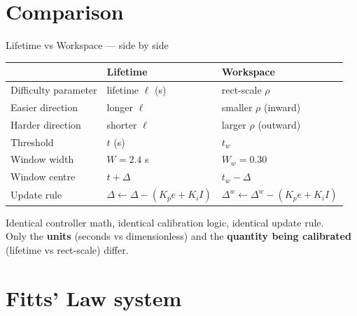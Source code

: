 \documentclass[10pt,aspectratio=169]{beamer}
\begin{document}
\section{Comparison}

\begin{frame}{Lifetime vs Workspace --- side by side}
\begin{center}
\begin{tabular}{lll}
\toprule
& \textbf{Lifetime} & \textbf{Workspace} \\
\midrule
Difficulty parameter & lifetime $\ell$ (s) & rect-scale $\rho$ \\
Easier direction & longer $\ell$ & smaller $\rho$ (inward) \\
Harder direction & shorter $\ell$ & larger $\rho$ (outward) \\
Threshold & $t$ (s) & $t_w$ \\
Window width & $W = 2.4$ s & $W_w = 0.30$ \\
Window centre & $t + \Delta$ & $t_w - \Delta$ \\
Update rule & $\Delta \leftarrow \Delta - (K_p e + K_i I)$ & $\Delta^w \leftarrow \Delta^w - (K_p e + K_i I)$ \\
\bottomrule
\end{tabular}
\end{center}

\vspace{0.8em}
Identical controller math, identical calibration logic, identical update rule.\\
Only the \textbf{units} (seconds vs dimensionless) and the \textbf{quantity being calibrated} (lifetime vs rect-scale) differ.
\end{frame}

\section{Fitts' Law system}
\end{document}
